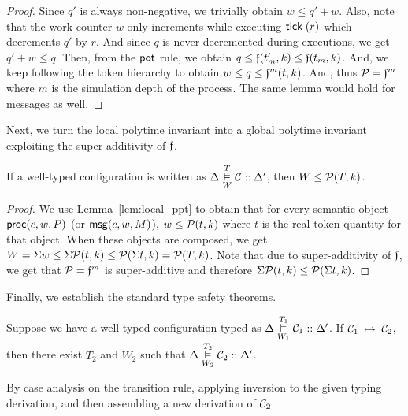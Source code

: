 \begin{proof}
  Since $q'$ is always non-negative, we trivially obtain $w \leq q'+w$.
  Also, note that the work counter $w$ only increments while executing $\mathsf{tick} \; (r)$
  which decrements $q'$ by $r$.
  And since $q$ is never decremented during executions, we get $q'+w \leq q$.
  Then, from the $\mathsf{pot}$ rule, we obtain $q \leq \mathfrak{f}(t_m', k) \leq \mathfrak{f}(t_m, k)$.
  And, we keep following the token hierarchy to obtain
  $w \leq q \leq \mathfrak{f}^{m}(t, k)$.
  And, thus $\mathcal{P} = \mathfrak{f}^{m}$ where $m$ is the simulation depth of the process.
  The same lemma would hold for messages as well.
\end{proof}

Next, we turn the local polytime invariant into a global polytime invariant exploiting
the super-additivity of $\mathfrak{f}$.

\begin{theorem} \label{thm:global_ppt}
  If a well-typed configuration is written as $\Delta \overset{T}{\underset{W}{\vDash}} \mathcal{C} :: \Delta'$,
  then $W \leq \mathcal{P}(T, k)$.
\end{theorem}

\begin{proof}
  We use Lemma~\ref{lem:local_ppt} to obtain that for every semantic object $\mathsf{proc}(c, w, P)$ (or $\mathsf{msg}(c, w, M)$),
  $w \leq \mathcal{P}(t, k)$ where $t$ is the real token quantity for that object.
  When these objects are composed, we get $W = \Sigma w \leq \Sigma \mathcal{P}(t, k) \leq
  \mathcal{P}(\Sigma t, k) = \mathcal{P}(T, k)$.
  Note that due to super-additivity of $\mathfrak{f}$, we get that $\mathcal{P} = \mathfrak{f}^m$ is super-additive
  and therefore $\Sigma \mathcal{P}(t, k) \leq \mathcal{P}(\Sigma t, k)$.
\end{proof}

Finally, we establish the standard type safety theorems.

\begin{theorem}
\label{thm:preservation}
Suppose we have a well-typed configuration typed as
$\Delta \overset{T_1}{\underset{W_1}{\vDash}} \mathcal{C}_1 :: \Delta'$.
If $\mathcal{C}_1 \; \mapsto \; \mathcal{C}_2$, then there exist $T_2$ and $W_2$ such
that $\Delta \overset{T_2}{\underset{W_2}{\vDash}} \mathcal{C}_2 :: \Delta'$.
\end{theorem}
\begin{proofsketch}
  By case analysis on the transition rule, applying inversion to the
  given typing derivation, and then assembling a new derivation of
  $\mathcal{C}_2$.
\end{proofsketch}

